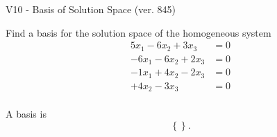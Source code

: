 \begin{exercise}
  \begin{exerciseTitle}V10 - Basis of Solution Space (ver. 845)\end{exerciseTitle}
  \begin{exerciseStatement}
    Find a basis for the solution space of the homogeneous system 
\begin{align*}
 5 x_ 1 -6 x_ 2 + 3 x_ 3 &= 0  \\ 
  -6 x_ 1 -6 x_ 2 + 2 x_ 3 &= 0  \\ 
  -1 x_ 1 + 4 x_ 2 -2 x_ 3 &= 0  \\ 
  + 4 x_ 2 -3 x_ 3 &= 0  \\ 
 \end{align*}


 
  \end{exerciseStatement}

  \begin{exerciseAnswer}
   A basis is   
\[\left\{\right\}.\]

  


  \end{exerciseAnswer}
\end{exercise}